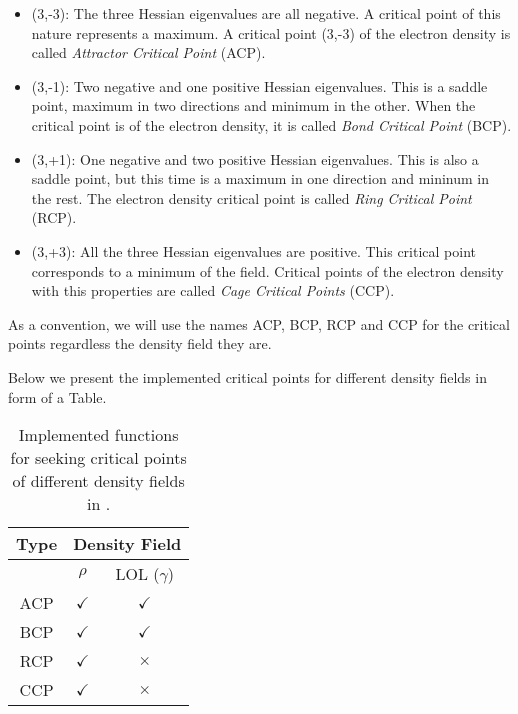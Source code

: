\begin{itemize}
   \item (3,-3): The three Hessian eigenvalues are all negative. A critical point of this nature represents a maximum. A critical point (3,-3) of the electron density is called \textit{Attractor Critical Point} (ACP).
   \item (3,-1): Two negative and one positive Hessian eigenvalues. This is a saddle point, maximum in two directions and minimum in the other. When the critical point is of the electron density, it is called \textit{Bond Critical Point} (BCP).
   \item (3,+1): One negative and two positive Hessian eigenvalues. This is also a saddle point, but this time is a maximum in one direction and mininum in the rest. The electron density critical point is called \textit{Ring Critical Point} (RCP).
   \item (3,+3): All the three Hessian eigenvalues are positive. This critical point corresponds to a minimum of the field. Critical points of the electron density with this properties are called \textit{Cage Critical Points} (CCP).
\end{itemize}

As a convention, we will use the names ACP, BCP, RCP and CCP for the critical points regardless the density field they are.

Below we present the implemented critical points for different density fields in form of a Table.

\begin{table}
\begin{center}
\begin{tabular}{||c|c|c||}
\hline
\hline
\textbf{Type} & \multicolumn{2}{|c||}{\textbf{Density Field}} \\
\hline
\hline
 & $\rho$ & LOL ($\gamma$) \\
\hline
ACP & $\checkmark$ & $\checkmark$ \\\hline
BCP & $\checkmark$ & $\checkmark$ \\\hline
RCP & $\checkmark$ & $\boldsymbol{\times}$ \\\hline
CCP & $\checkmark$ & $\boldsymbol{\times}$ \\\hline
\hline
\end{tabular}
\caption{Implemented functions for seeking critical points of different density fields in \DTK{} \dtkversion.}\label{tab:implemseeks}
\end{center}
\end{table}

